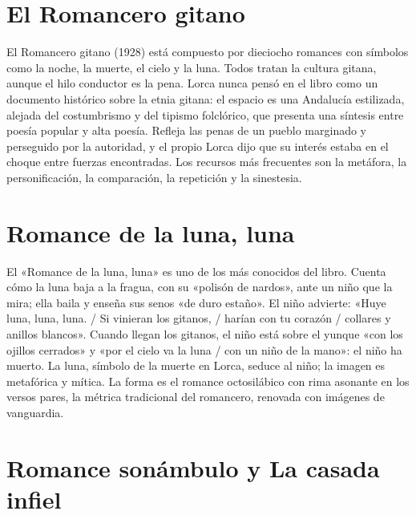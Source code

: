 \documentclass{book}
\begin{document}

\section{El Romancero gitano}

El Romancero gitano (1928) está compuesto por dieciocho romances con símbolos como la noche, la muerte, el cielo y la luna. Todos tratan la cultura gitana, aunque el hilo conductor es la pena. Lorca nunca pensó en el libro como un documento histórico sobre la etnia gitana: el espacio es una Andalucía estilizada, alejada del costumbrismo y del tipismo folclórico, que presenta una síntesis entre poesía popular y alta poesía. Refleja las penas de un pueblo marginado y perseguido por la autoridad, y el propio Lorca dijo que su interés estaba en el choque entre fuerzas encontradas. Los recursos más frecuentes son la metáfora, la personificación, la comparación, la repetición y la sinestesia.


\section{Romance de la luna, luna}

El «Romance de la luna, luna» es uno de los más conocidos del libro. Cuenta cómo la luna baja a la fragua, con su «polisón de nardos», ante un niño que la mira; ella baila y enseña sus senos «de duro estaño». El niño advierte: «Huye luna, luna, luna. / Si vinieran los gitanos, / harían con tu corazón / collares y anillos blancos». Cuando llegan los gitanos, el niño está sobre el yunque «con los ojillos cerrados» y «por el cielo va la luna / con un niño de la mano»: el niño ha muerto. La luna, símbolo de la muerte en Lorca, seduce al niño; la imagen es metafórica y mítica. La forma es el romance octosilábico con rima asonante en los versos pares, la métrica tradicional del romancero, renovada con imágenes de vanguardia.


\section{Romance sonámbulo y La casada infiel}
\end{document}

